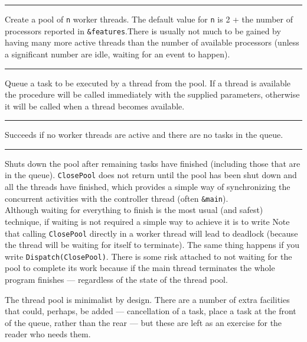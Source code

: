 \bigskip\hrule\vspace{0.1cm}
\noindent{}
Create a pool of \texttt{n} worker threads. The default value for \texttt{n} is
2 + the number of processors reported in \texttt{\&features}.There is usually
not much to be gained by having many more active threads than the number of
available processors (unless a significant number are idle, waiting for an event
to happen).

\bigskip\hrule\vspace{0.1cm}
\noindent{}
Queue a task to be executed by a thread from the pool. If a thread is available
the procedure will be called immediately with the supplied parameters, otherwise
it will be called when a thread becomes available.\\

\bigskip\hrule\vspace{0.1cm}
\noindent{}
Succeeds if no worker threads are active and there are no tasks in the queue.\\

\bigskip\hrule\vspace{0.1cm}
\noindent{}
Shuts down the pool after remaining tasks have finished
(including those that are in the queue). \texttt{ClosePool} does not return
until the pool has been shut down and all the threads have finished, which
provides a simple way of synchronizing the concurrent activities with the
controller thread (often \texttt{\&main}).\\

Although waiting for everything to finish is the most usual (and safest)
technique, if waiting is not required a simple way to achieve it is to write
{\small
{}
}
Note that calling \texttt{ClosePool} directly in a worker thread will lead to
deadlock (because the thread will be waiting for itself to terminate).  The same
thing happens if you write \texttt{Dispatch(ClosePool)}.  There is some risk
attached to not waiting for the pool to complete its work because if the main
thread terminates the whole program finishes --- regardless of the state of the
thread pool.

The thread pool is minimalist by design. There are a number of extra facilities
that could, perhaps, be added --- cancellation of a task, place a task at the
front of the queue, rather than the rear --- but these are left as an exercise
for the reader who needs them.

